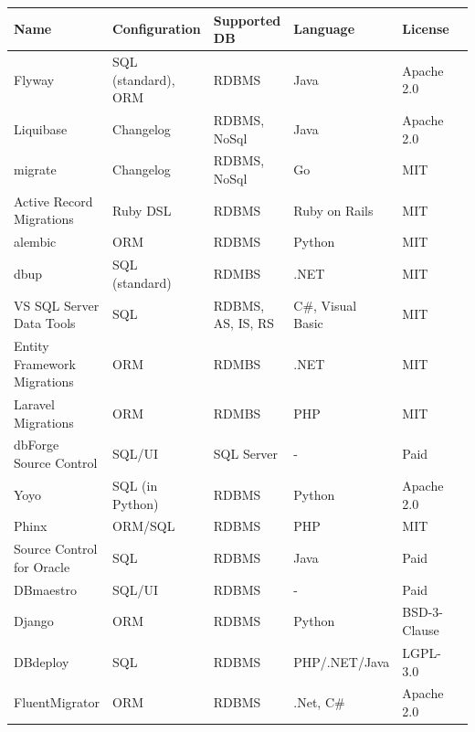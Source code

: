 \begin{table}[H]
	\centering
	\begin{tabularx}{15cm}{p{3cm} p{3cm} p{2cm} l l p{2cm} }
		\toprule
		Name & Configuration & Supported DB  & Language & License\\ 
		\midrule
		Flyway & SQL (standard), ORM & RDBMS & Java & Apache 2.0 \\
		Liquibase & Changelog & RDBMS, NoSql & Java & Apache 2.0 \\
		migrate & Changelog & RDBMS, NoSql &  Go & MIT\\
		Active Record Migrations & Ruby DSL & RDBMS & Ruby on Rails & MIT\\
		alembic & ORM & RDBMS & Python &  MIT \\
		dbup & SQL (standard) & RDMBS& .NET & MIT\\
		VS SQL Server Data Tools & SQL & RDBMS, \gls{AS}, \gls{IS}, \gls{RS} & C\#, Visual Basic & MIT \\
		Entity Framework Migrations & ORM & RDMBS & .NET & MIT \\
		Laravel Migrations & ORM & RDMBS & PHP & MIT \\
		dbForge Source Control & SQL/UI & SQL Server & - & Paid\\
		Yoyo & SQL (in Python) & RDBMS & Python & Apache 2.0\\
		Phinx & ORM/SQL & RDBMS &  PHP & MIT\\
		Source Control for Oracle & SQL & RDBMS & Java & Paid\\
		DBmaestro & SQL/UI & RDBMS & - & Paid\\
		Django & ORM & RDBMS& Python & BSD-3-Clause\\
		DBdeploy & SQL & RDBMS & PHP/.NET/Java & LGPL-3.0\\
		FluentMigrator & ORM &RDBMS& .Net, C\# & Apache 2.0\\
	\end{tabularx}
\end{table}

